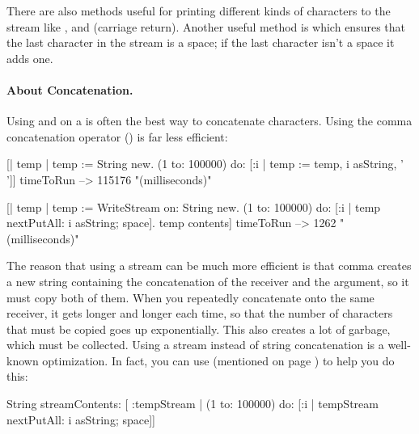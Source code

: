 \documentclass[a4paper,10pt,twoside]{book}
\begin{document}
There are also methods useful for printing different kinds of characters to
the stream like ,  and
 (carriage return). Another useful
method is  which ensures that the last character
in the stream is a space; if the last character isn't a space it adds one.

\paragraph{About Concatenation.}
Using  and  on a  is often the best way to
concatenate characters. Using the comma concatenation operator (\ct{,}) is far
less efficient:

\begin{code}{}
[| temp |
  temp := String new.
  (1 to: 100000)
    do: [:i | temp := temp, i asString, ' ']] timeToRun --> 115176 "(milliseconds)"

[| temp |
  temp := WriteStream on: String new.
  (1 to: 100000)
    do: [:i | temp nextPutAll: i asString; space].
  temp contents] timeToRun --> 1262 "(milliseconds)"
\end{code}

The reason that using a stream can be much more efficient is that 
comma creates a new string containing
the concatenation of the receiver and the argument, so it must copy both of them.
When you repeatedly concatenate onto the same receiver, it gets longer and longer each time,
so that the number of characters that must be copied goes up exponentially.
This also creates a lot of garbage, which must be collected. Using
a stream instead of string concatenation is a well-known optimization.
In fact, you can use  (mentioned on page \pageref{sec:streamContents}) to help you do this:

\begin{code}{}
String streamContents: [ :tempStream |
  (1 to: 100000)
       do: [:i | tempStream nextPutAll: i asString; space]] 
\end{code}

\end{document}
